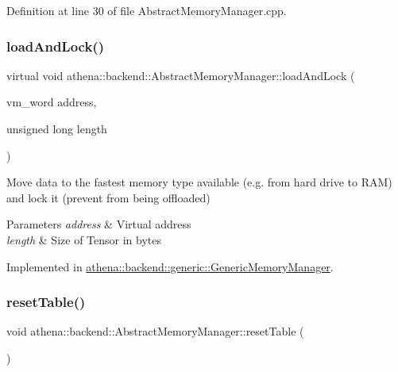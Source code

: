 Definition at line 30 of file Abstract\+Memory\+Manager.\+cpp.

\mbox{\label{classathena_1_1backend_1_1_abstract_memory_manager_a9fe52e4020802d6f526fba06adce8407}} 
\subsubsection{\texorpdfstring{load\+And\+Lock()}{loadAndLock()}\hspace{0.1cm}{\footnotesize\ttfamily [3/3]}}
{\footnotesize\ttfamily virtual void athena\+::backend\+::\+Abstract\+Memory\+Manager\+::load\+And\+Lock (\begin{DoxyParamCaption}\item[{vm\+\_\+word}]{address,  }\item[{unsigned long}]{length }\end{DoxyParamCaption})\hspace{0.3cm}{\ttfamily [pure virtual]}}

Move data to the fastest memory type available (e.\+g. from hard drive to R\+AM) and lock it (prevent from being offloaded) 
\begin{DoxyParams}{Parameters}
{\em address} & Virtual address \\
\hline
{\em length} & Size of Tensor in bytes \\
\hline
\end{DoxyParams}


Implemented in \mbox{\hyperlink{classathena_1_1backend_1_1generic_1_1_generic_memory_manager_aa7fce5a6cbd9c4f5ad1868735e4546a8}{athena\+::backend\+::generic\+::\+Generic\+Memory\+Manager}}.

\mbox{\label{classathena_1_1backend_1_1_abstract_memory_manager_a358f614d4358f5dce28f17dba6917b1f}} 
\subsubsection{\texorpdfstring{reset\+Table()}{resetTable()}}
{\footnotesize\ttfamily void athena\+::backend\+::\+Abstract\+Memory\+Manager\+::reset\+Table (\begin{DoxyParamCaption}{ }\end{DoxyParamCaption})}

